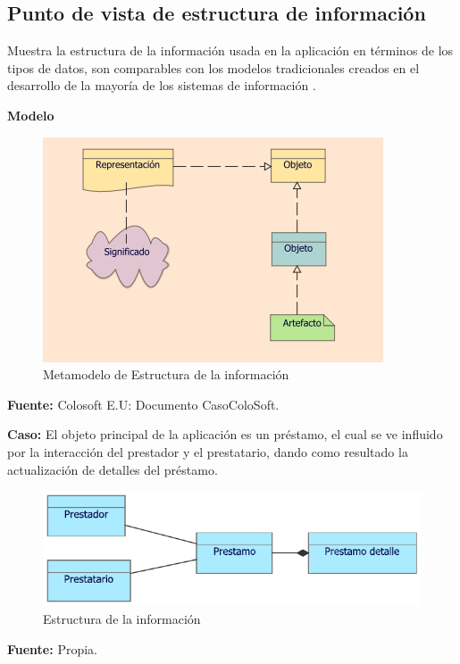 	\subsection{Punto de vista de estructura de información}
	{Muestra la estructura de la información usada en la aplicación en términos de los tipos de datos, son comparables con los modelos tradicionales creados en el desarrollo de la mayoría de los sistemas de información \cite{archimate}.
	\newpage
			
		\textbf{Modelo}\\
		\begin{figure}[H]
			\centering
			\includegraphics[width=0.8\linewidth]{development/estructurainfo.png}
			\caption{Metamodelo de Estructura de la información}
		\end{figure}
		\begin{center}
			\textbf{Fuente:} Colosoft E.U: Documento CasoColoSoft.
		\end{center}
		\hfill \break
		
		\textbf{Caso:} El objeto principal de la aplicación es un préstamo, el cual se ve influido por la interacción del prestador y el prestatario, dando como resultado la actualización de detalles del préstamo.
		
		\begin{figure}[H]
			\centering
			\includegraphics[width=0.8\linewidth]{development/estructurainfo.pdf}
			\caption{Estructura de la información}
		\end{figure}
		\begin{center}
			\textbf{Fuente:} Propia.
		\end{center}
	}
	
